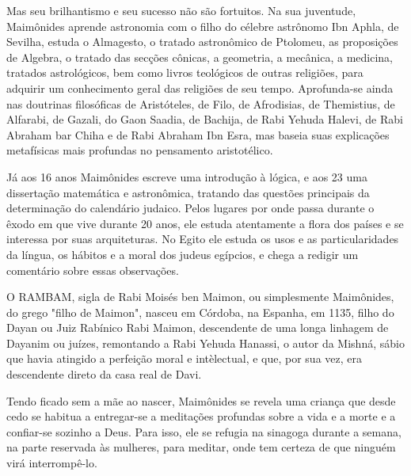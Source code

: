 \begin{itemize}
Mas seu brilhantismo e seu sucesso não são fortuitos. Na sua juven­tude,
Maimônides aprende astronomia com o filho do célebre astrônomo Ibn
Aphla, de Sevilha, estuda o Almagesto, o tratado astronômico de
Ptolomeu, as proposições de Algebra, o tratado das secções cônicas, a
geometria, a mecâni­ca, a medicina, tratados astrológicos, bem como
livros teológicos de outras re­ligiões, para adquirir um conhecimento
geral das religiões de seu tempo. Apro­funda-se ainda nas doutrinas
filosóficas de Aristóteles, de Filo, de Afrodisias, de Themistius, de
Alfarabi, de Gazali, do Gaon Saadia, de Bachija, de Rabi Ye­huda Halevi,
de Rabi Abraham bar Chiha e de Rabi Abraham Ibn Esra, mas ba­seia suas
explicações metafísicas mais profundas no pensamento aristotélico.

Já aos 16 anos Maimônides escreve uma introdução à lógica, e aos 23 uma
dissertação matemática e astronômica, tratando das questões principais
da determinação do calendário judaico. Pelos lugares por onde passa
durante o êxodo em que vive durante 20 anos, ele estuda atentamente a
flora dos países e se interessa por suas arquiteturas. No Egito ele
estuda os usos e as particulari­dades da língua, os hábitos e a moral
dos judeus egípcios, e chega a redigir um comentário sobre essas
observações.

O RAMBAM, sigla de Rabi Moisés ben Maimon, ou simplesmente Mai­mônides,
do grego "filho de Maimon", nasceu em Córdoba, na Espanha, em 1135,
filho do Dayan ou Juiz Rabínico Rabi Maimon, descendente de uma longa 
linhagem de Dayanim ou juízes, remontando a Rabi Yehuda Hanassi, o
autor da Mishná, sábio que havia atingido a perfeição moral e
intèlectual, e que, por sua vez, era descendente direto da casa real de
Davi.

Tendo ficado sem a mãe ao nascer, Maimônides se revela uma crian­ça que
desde cedo se habitua a entregar-se a meditações profundas sobre a vida
e a morte e a confiar-se sozinho a Deus. Para isso, ele se refugia na
sinagoga durante a semana, na parte reservada às mulheres, para meditar,
onde tem cer­teza de que ninguém virá interrompê-lo.


\end{itemize}
